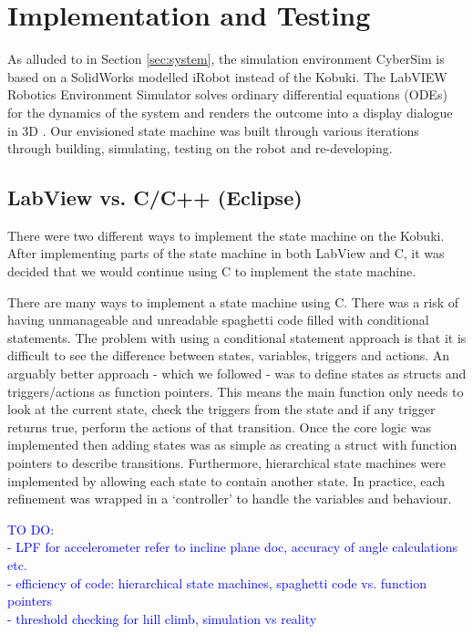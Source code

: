 \documentclass[11pt]{article}
\begin{document}
\newpage
\section{Implementation and Testing}
As alluded to in Section \ref{sec:system}, the simulation environment CyberSim is based on a SolidWorks modelled iRobot instead of the Kobuki. The LabVIEW Robotics Environment Simulator solves ordinary differential equations (ODEs) for the dynamics of the system and renders the outcome into a display dialogue in 3D \cite{labguide}. Our envisioned state machine was built through various iterations through building, simulating, testing on the robot and re-developing.

\subsection{LabView vs. C/C++ (Eclipse)}
There were two different ways to implement the state machine on the Kobuki. After implementing parts of the state machine in both LabView and C, it was decided that we would continue using C to implement the state machine. 

There are many ways to implement a state machine using C. There was a risk of having unmanageable and unreadable spaghetti code filled with conditional statements. The problem with using a conditional statement approach is that it is difficult to see the difference between states, variables, triggers and actions. An arguably better approach - which we followed - was to define states as structs and triggers/actions as function pointers. This means the main function only needs to look at the current state, check the triggers from the state and if any trigger returns true, perform the actions of that transition. Once the core logic was implemented then adding states was as simple as creating a struct with function pointers to describe transitions. Furthermore, hierarchical state machines were implemented by allowing each state to contain another state. In practice, each refinement was wrapped in a `controller' to handle the variables and behaviour.

\textcolor{blue}{TO DO:\\
- LPF for accelerometer refer to incline plane doc, accuracy of angle calculations etc.\\
- efficiency of code: hierarchical state machines, spaghetti code vs. function pointers\\
- threshold checking for hill climb, simulation vs reality
}
\end{document}
